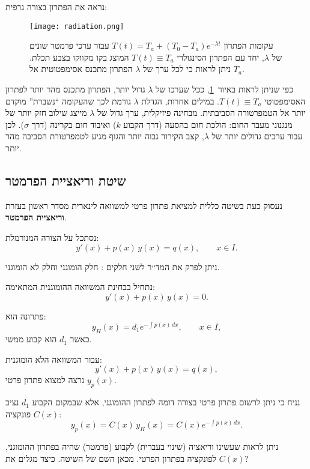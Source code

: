 \documentclass{article}
\numberwithin{equation}{section}
\begin{document}
נראה את הפתרון בצורה גרפית:
\begin{figure}[H]
    \centering
    \texttt{[image: radiation.png]}
    \caption{עקומות הפתרון 
    $T(t) = T_a + (T_0 - T_a)e^{-\lambda t}$ 
    עבור ערכי פרמטר שונים של $\lambda$, 
    יחד עם הפתרון הסינגולרי $T(t)\equiv T_a$ המוצג בקו מקווקו בצבע תכלת. 
    ניתן לראות כי לכל ערך של $\lambda$ הפתרון מתכנס אסימפטוטית אל $T_a$.}
    \label{fig:radiation}
\end{figure}
\noindent
כפי שניתן לראות באיור~\ref{fig:radiation}, ככל שערכו של $\lambda$ גדול יותר, 
הפתרון מתכנס מהר יותר לפתרון האסימפטוטי $T(t)\equiv T_a$. 
במילים אחרות, הגדלת $\lambda$ גורמת לכך שהעקומה ``נשברת'' מוקדם יותר אל הטמפרטורה הסביבתית. 
מבחינה פיזיקלית, ערך גדול של $\lambda$ מייצג שילוב חזק יותר של מנגנוני מעבר החום:
הולכת חום בהסעה (דרך הקבוע $k$) ואיבוד חום בקרינה (דרך $\sigma$). 
לכן עבור ערכים גדולים יותר של $\lambda$, קצב הקירור גבוה יותר והגוף מגיע לטמפרטורת הסביבה מהר יותר.


\newpage
\subsection{שיטת וריאציית הפרמטר}

נעסוק כעת בשיטה כללית למציאת פתרון פרטי למשוואה לינארית מסדר ראשון בעזרת \textbf{וריאציית הפרמטר}.  

נסתכל על הצורה המנורמלת:
\begin{equation}
y'(x) + p(x) \, y(x) = q(x), \qquad x \in I.
\end{equation}

ניתן לפרק את המד׳׳ר לשני חלקים : חלק הומוגני וחלק לא הומוגני.

נתחיל בבחינת המשוואה ההומוגנית המתאימה:
\[
y'(x) + p(x)\, y(x) = 0.
\]

פתרונה הוא:
\begin{equation}
y_H(x) = d_1 e^{-\int p(x)\,dx}, \qquad x \in I,
\end{equation}
כאשר $d_1$ הוא קבוע ממשי.

עבור המשוואה הלא הומוגנית:
\[
y'(x) + p(x)\,y(x) = q(x),
\]
נרצה למצוא פתרון פרטי $y_p(x)$.  

נניח כי ניתן לרשום פתרון פרטי בצורה דומה לפתרון ההומוגני, אלא שבמקום הקבוע $d_1$ נציב פונקציה $C(x)$:
\begin{equation}
y_p(x) = C(x)\,y_H(x) = C(x)e^{-\int p(x)\,dx}.
\end{equation}

ניתן לראות שעשינו וריאציה (שינוי בעברית) לקבוע  (פרמטר) שהיה בפתרון ההומוגני, לפונקציה בפתרון הפרטי. מכאן השם של השיטה.
כיצד מגלים את $C(x)$? 
\end{document}
